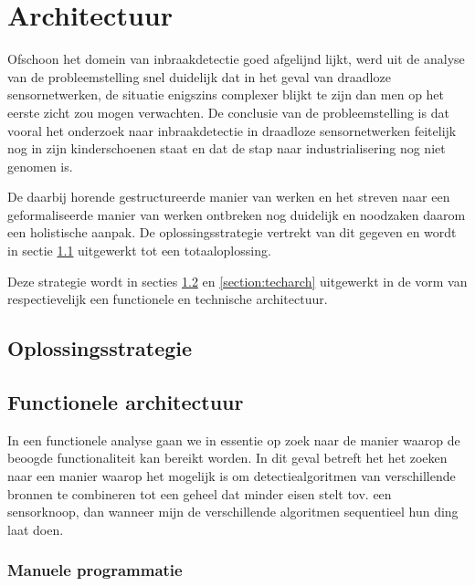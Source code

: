 
\chapter{Architectuur}
\label{chapter:architectuur}

Ofschoon het domein van inbraakdetectie goed afgelijnd lijkt, werd uit de
analyse van de probleemstelling snel duidelijk dat in het geval van draadloze
sensornetwerken, de situatie enigszins complexer blijkt te zijn dan men op het
eerste zicht zou mogen verwachten. De conclusie van de probleemstelling is dat
vooral het onderzoek naar inbraakdetectie in draadloze sensornetwerken
feitelijk nog in zijn kinderschoenen staat en dat de stap naar
industrialisering nog niet genomen is.

De daarbij horende gestructureerde manier van werken en het streven naar een
geformaliseerde manier van werken ontbreken nog duidelijk en noodzaken daarom
een holistische aanpak. De oplossingsstrategie vertrekt van dit gegeven en
wordt in sectie \ref{section:strategy} uitgewerkt tot een totaaloplossing.

Deze strategie wordt in secties \ref{section:funcarch} en
\ref{section:techarch} uitgewerkt in de vorm van respectievelijk een
functionele en technische architectuur.

\section{Oplossingsstrategie}
\label{section:strategy}

\TODO

\section{Functionele architectuur}
\label{section:funcarch}

In een functionele analyse gaan we in essentie op zoek naar de manier waarop de
beoogde functionaliteit kan bereikt worden. In dit geval betreft het het zoeken
naar een manier waarop het mogelijk is om detectiealgoritmen van verschillende
bronnen te combineren tot een geheel dat minder eisen stelt tov. een
sensorknoop, dan wanneer mijn de verschillende algoritmen sequentieel hun ding
laat doen.

\subsection{Manuele programmatie}

